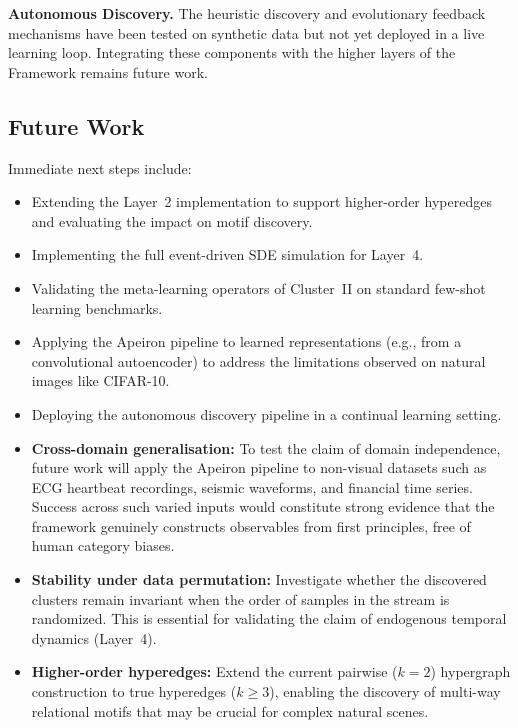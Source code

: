 \textbf{Autonomous Discovery.} The heuristic discovery and evolutionary feedback mechanisms have been tested on synthetic data but not yet deployed in a live learning loop. Integrating these components with the higher layers of the \Apeiron{} Framework remains future work.

\subsection{Future Work}

Immediate next steps include:
\begin{itemize}
    \item Extending the Layer~2 implementation to support higher-order hyperedges and evaluating the impact on motif discovery.
    \item Implementing the full event-driven SDE simulation for Layer~4.
    \item Validating the meta-learning operators of Cluster~II on standard few-shot learning benchmarks.
    \item Applying the Apeiron pipeline to learned representations (e.g., from a convolutional autoencoder) to address the limitations observed on natural images like CIFAR-10.
    \item Deploying the autonomous discovery pipeline in a continual learning setting.
    \item \textbf{Cross-domain generalisation:} To test the claim of domain independence, future work will apply the Apeiron pipeline to non-visual datasets such as ECG heartbeat recordings, seismic waveforms, and financial time series. Success across such varied inputs would constitute strong evidence that the framework genuinely constructs observables from first principles, free of human category biases.
    \item \textbf{Stability under data permutation:} Investigate whether the discovered clusters remain invariant when the order of samples in the stream is randomized. This is essential for validating the claim of endogenous temporal dynamics (Layer~4).
    \item \textbf{Higher-order hyperedges:} Extend the current pairwise ($k=2$) hypergraph construction to true hyperedges ($k \ge 3$), enabling the discovery of multi-way relational motifs that may be crucial for complex natural scenes.
\end{itemize}
